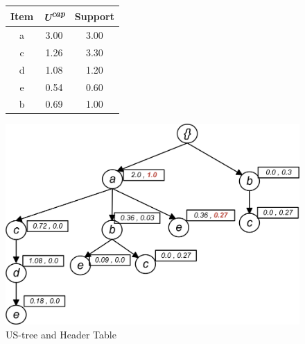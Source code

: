 %

\begin{figure}
\begin{minipage}{0.40\textwidth}
  \centering
  
	\begin{center}
	\begin{tabular}{ |c|c|c| } 
 	\hline
 		Item&\emph{U\textsuperscript{cap}}&Support\\ \hline\hline
 		a &  3.00  & 3.00	\\ \hline
 		c &  1.26  & 3.30	\\ \hline
 		d &  1.08  & 1.20	\\ \hline
 		e &  0.54  & 0.60	\\ \hline
 		b &  0.69  & 1.00	\\ \hline
\end{tabular}
\end{center}   
\end{minipage}
\hfill
\begin{minipage}{0.40\textwidth}
  \centering
  \includegraphics[width=\textwidth]{images/sim_06.jpg}
\end{minipage}
\caption{US-tree and Header Table}
\label{figure:min_before}
\end{figure}


